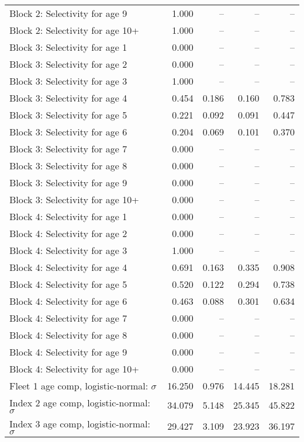 \documentclass[
]{article}
\begin{document}
\begin{landscape}
\begin{longtable}[t]{lrrrr}
Block 2: Selectivity for age 9 & 1.000 & -- & -- & --\\
Block 2: Selectivity for age 10+ & 1.000 & -- & -- & --\\
Block 3: Selectivity for age 1 & 0.000 & -- & -- & --\\
Block 3: Selectivity for age 2 & 0.000 & -- & -- & --\\
\addlinespace
Block 3: Selectivity for age 3 & 1.000 & -- & -- & --\\
Block 3: Selectivity for age 4 & 0.454 & 0.186 & 0.160 & 0.783\\
Block 3: Selectivity for age 5 & 0.221 & 0.092 & 0.091 & 0.447\\
Block 3: Selectivity for age 6 & 0.204 & 0.069 & 0.101 & 0.370\\
Block 3: Selectivity for age 7 & 0.000 & -- & -- & --\\
\addlinespace
Block 3: Selectivity for age 8 & 0.000 & -- & -- & --\\
Block 3: Selectivity for age 9 & 0.000 & -- & -- & --\\
Block 3: Selectivity for age 10+ & 0.000 & -- & -- & --\\
Block 4: Selectivity for age 1 & 0.000 & -- & -- & --\\
Block 4: Selectivity for age 2 & 0.000 & -- & -- & --\\
\addlinespace
Block 4: Selectivity for age 3 & 1.000 & -- & -- & --\\
Block 4: Selectivity for age 4 & 0.691 & 0.163 & 0.335 & 0.908\\
Block 4: Selectivity for age 5 & 0.520 & 0.122 & 0.294 & 0.738\\
Block 4: Selectivity for age 6 & 0.463 & 0.088 & 0.301 & 0.634\\
Block 4: Selectivity for age 7 & 0.000 & -- & -- & --\\
\addlinespace
Block 4: Selectivity for age 8 & 0.000 & -- & -- & --\\
Block 4: Selectivity for age 9 & 0.000 & -- & -- & --\\
Block 4: Selectivity for age 10+ & 0.000 & -- & -- & --\\
Fleet 1 age comp, logistic-normal: $\sigma$ & 16.250 & 0.976 & 14.445 & 18.281\\
Index 2 age comp, logistic-normal: $\sigma$ & 34.079 & 5.148 & 25.345 & 45.822\\
\addlinespace
Index 3 age comp, logistic-normal: $\sigma$ & 29.427 & 3.109 & 23.923 & 36.197\\*
\end{longtable}
\end{landscape}
\end{document}

